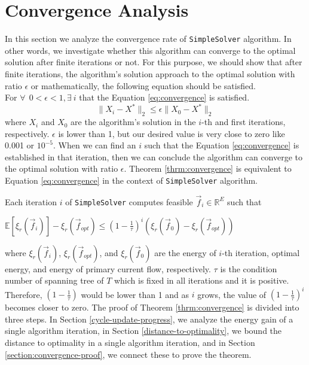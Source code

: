 
\section{Convergence Analysis}\label{sec:conv}
In this section we analyze the convergence rate of \texttt{SimpleSolver} algorithm. In other words, we investigate whether this algorithm can converge to the optimal solution after finite iterations or not. For this purpose, we should show that after finite iterations, the algorithm's solution approach to the optimal solution with ratio $\epsilon$ or mathematically, the following equation should be satisfied. \\
For $\forall ~~ 0<\epsilon<1, \exists ~ i$ that the Equation \ref{eq:convergence} is satisfied.
\begin{equation}
    \label{eq:convergence}
    \| X_i -X^* \|_2 \leq \epsilon \|X_0 - X^* \|_2
\end{equation}
where $X_i$ and $X_0$ are the algorithm's solution in the $i$-th and first iterations, respectively. $\epsilon$ is lower than 1, but our desired value is very close to zero like 0.001 or $10^{-5}$. When we can find an $i$ such that the Equation \ref{eq:convergence} is established in that iteration, then we can conclude the algorithm can converge to the optimal solution with ratio $\epsilon$.
Theorem \ref{thrm:convergence} is equivalent to Equation \ref{eq:convergence} in the context of \texttt{SimpleSolver} algorithm.

\begin{theorem}
    Each iteration $i$ of \texttt{SimpleSolver} computes feasible $\overrightarrow{f}_i \in \mathds{R}^E$ such that
    \begin{center}
        $\mathds{E}[\xi_r(\overrightarrow{f}_i)]-\xi_r(\overrightarrow{f}_{opt}) \leq (1-\frac{1}{\tau})^i (\xi_r(\overrightarrow{f}_0) - \xi_r(\overrightarrow{f}_{opt}))$ 
    \end{center}
    \label{thrm:convergence}
\end{theorem}
where $\xi_r(\overrightarrow{f}_i)$, $\xi_r(\overrightarrow{f}_{opt})$, and $\xi_r(\overrightarrow{f}_0)$ are the energy of $i$-th iteration, optimal energy, and energy of primary current flow, respectively. $\tau$ is the condition number of spanning tree of $T$ which is fixed in all iterations and it is positive. Therefore, $(1-\frac{1}{\tau})$ would be lower than 1 and as $i$ grows, the value of $(1-\frac{1}{\tau})^i$ becomes closer to zero. The proof of Theorem \ref{thrm:convergence} is divided into three steps. In Section \ref{cycle-update-progress}, we analyze the energy gain of a single algorithm iteration, in Section \ref{distance-to-optimality}, we bound the distance to optimality in a single algorithm iteration, and in Section \ref{section:convergence-proof}, we connect these to prove the theorem.

